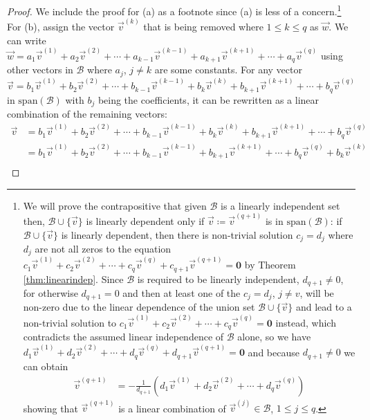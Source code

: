 \begin{proof}
We include the proof for (a) as a footnote since (a) is less of a concern.\footnote{We will prove the contrapositive that given $\mathcal{B}$ is a linearly independent set then, $\mathcal{B} \cup \{\vec{v}\}$ is linearly dependent only if $\vec{v} \coloneq \vec{v}^{(q+1)}$ is in $\text{span}(\mathcal{B})$: if $\mathcal{B} \cup \{\vec{v}\}$ is linearly dependent, then there is non-trivial solution $c_j = d_j$ where $d_j$ are not all zeros to the equation $c_1\vec{v}^{(1)} + c_2\vec{v}^{(2)} + \cdots + c_q\vec{v}^{(q)} + c_{q+1}\vec{v}^{(q+1)} = \textbf{0}$ by Theorem \ref{thm:linearindep}. Since $\mathcal{B}$ is required to be linearly independent, $d_{q+1} \neq 0$, for otherwise $d_{q+1} = 0$ and then at least one of the $c_j = d_j$, $j \neq v$, will be non-zero due to the linear dependence of the union set $\mathcal{B} \cup \{\vec{v}\}$ and lead to a non-trivial solution to $c_1\vec{v}^{(1)} + c_2\vec{v}^{(2)} + \cdots + c_q\vec{v}^{(q)} = \textbf{0}$ instead, which contradicts the assumed linear independence of $\mathcal{B}$ alone, so we have $d_1\vec{v}^{(1)} + d_2\vec{v}^{(2)} + \cdots + d_q\vec{v}^{(q)} + d_{q+1}\vec{v}^{(q+1)} = \textbf{0}$ and because $d_{q+1} \neq 0$ we can obtain
\begin{align*}
\vec{v}^{(q+1)} &= -\frac{1}{d_{q+1}}(d_1\vec{v}^{(1)} + d_2\vec{v}^{(2)} + \cdots + d_q\vec{v}^{(q)})
\end{align*}
showing that $\vec{v}^{(q+1)}$ is a linear combination of $\vec{v}^{(j)} \in \mathcal{B}$, $1 \leq j \leq q$.} For (b), assign the vector $\vec{v}^{(k)}$ that is being removed where $1 \leq k \leq q$ as $\vec{w}$. We can write $\vec{w} = a_1\vec{v}^{(1)} + a_2\vec{v}^{(2)} + \cdots + a_{k-1}\vec{v}^{(k-1)} + a_{k+1}\vec{v}^{(k+1)} + \cdots + a_q\vec{v}^{(q)}$ using other vectors in $\mathcal{B}$ where $a_j$, $j \neq k$ are some constants. For any vector $\vec{v} = b_1\vec{v}^{(1)} + b_2\vec{v}^{(2)} + \cdots + b_{k-1}\vec{v}^{(k-1)} + b_k\vec{v}^{(k)} + b_{k+1}\vec{v}^{(k+1)} + \cdots + b_q\vec{v}^{(q)}$ in $\text{span}(\mathcal{B})$ with $b_j$ being the coefficients, it can be rewritten as a linear combination of the remaining vectors:
\begin{align*}
\vec{v} &= b_1\vec{v}^{(1)} + b_2\vec{v}^{(2)} + \cdots + b_{k-1}\vec{v}^{(k-1)} + b_k\vec{v}^{(k)} + b_{k+1}\vec{v}^{(k+1)} + \cdots + b_q\vec{v}^{(q)} \\
&= b_1\vec{v}^{(1)} + b_2\vec{v}^{(2)} + \cdots + b_{k-1}\vec{v}^{(k-1)} + b_{k+1}\vec{v}^{(k+1)} + \cdots + b_q\vec{v}^{(q)} + b_k\vec{v}^{(k)} \\

\end{align*}
\end{proof}
